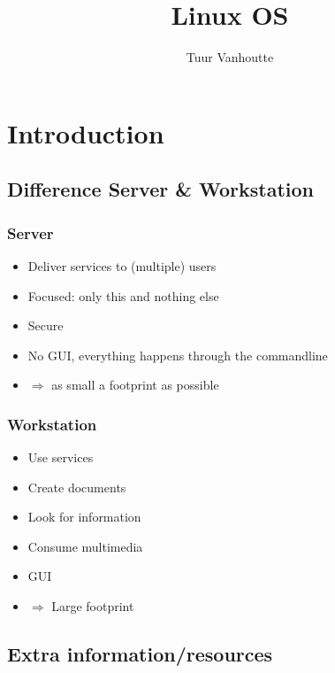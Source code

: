 \documentclass{article}
\begin{document}
\begin{titlepage}
    \author{Tuur Vanhoutte}
    \title{Linux OS}
\end{titlepage}

\maketitle
\newpage
\tableofcontents
\newpage


\section{Introduction}

\subsection{Difference Server \& Workstation}

\subsubsection{Server}

\begin{itemize}
    \item Deliver services to (multiple) users
    \item Focused: only this and nothing else
    \item Secure
    \item No GUI, everything happens through the commandline
    \item $\Rightarrow$ as small a footprint as possible
\end{itemize}

\subsubsection{Workstation}

\begin{itemize}
    \item Use services
    \item Create documents
    \item Look for information
    \item Consume multimedia
    \item GUI
    \item $\Rightarrow$ Large footprint
\end{itemize}

\subsection{Extra information/resources}
\end{document}
